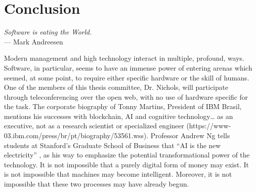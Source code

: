 \chapter{Conclusion}
\bigskip

\begin{flushright}{\slshape
	Software is eating the World.} \\ \medskip
    --- Mark Andreesen \citep{andreesen:2011}
\end{flushright}
\bigskip
\bigskip

\noindent Modern management and high technology interact in multiple, profound, ways.  Software, in particular, seems to have an immense power of entering arenas which seemed, at some point, to require either specific hardware or the skill of humans.  One of the members of this thesis committee, Dr. Nichols, will participate through teleconferencing over the open web, with no use of hardware specific for the task.  The corporate biography of Tonny Martins, President of IBM Brasil, mentions his successes with blockchain, AI and cognitive technology… as an executive, not as a research scientist or specialized engineer (https://www-03.ibm.com/press/br/pt/biography/53561.wss). Professor Andrew Ng tells students at Stanford’s Graduate School of Business that ``AI is the new electricity'' \citet{AndrewNgAI}, as his way to emphasize the potential transformational power of the technology.  It is not impossible that a purely digital form of money may exist.  It is not impossible that machines may become intelligent.  Moreover, it is not impossible that these two processes may have already begun.  

